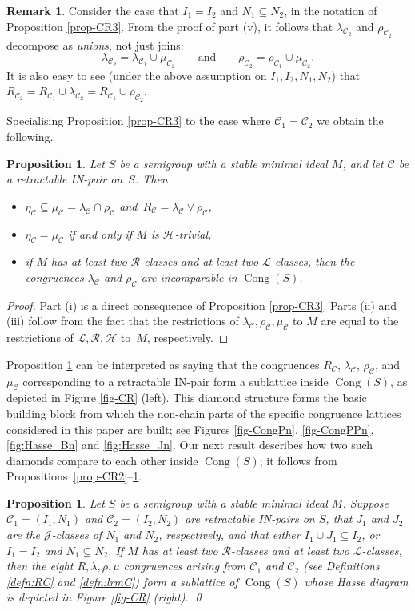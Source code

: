 \documentclass[11pt,a4paper]{article}
\newcommand{\C}{\mathscr C}
\renewcommand{\H}{\mathrel{\mathscr H}}
\renewcommand{\L}{\mathrel{\mathscr L}}
\newcommand{\R}{\mathrel{\mathscr R}}
\newcommand{\gJ}{\mathrel{\mathscr J}}
\newcommand{\lam}{\lambda}
\newcommand{\Cong}{\operatorname{Cong}}
\newcommand{\1}{\id_n}
\newcommand{\sub}{\subseteq}
\newcommand{\AND}{\qquad\text{and}\qquad}
\newcommand{\bit}{\begin{itemize}}
\newcommand{\eit}{\end{itemize}}
\newcommand{\itemit}[1]{\item[\emph{(#1)}]}
\newcommand{\pf}{\begin{proof}}
\newcommand{\epf}{\end{proof}}
\newcommand{\epfres}{\hfill\qed}
\numberwithin{equation}{section}
\newtheorem{prop}[equation]{Proposition}
\theoremstyle{definition}
\newtheorem{rem}[equation]{Remark}
\begin{document}
\begin{rem}\label{rem:nonprincipal}
Consider the case that $I_1=I_2$ and $N_1\sub N_2$, in the notation of Proposition \ref{prop-CR3}.  From the proof of part (v), it follows that $\lam_{\C_2}$ and $\rho_{\C_2}$ decompose as \emph{unions}, not just joins:
\[
\lam_{\C_2} = \lam_{\C_1}\cup\mu_{\C_2} \AND \rho_{\C_2} = \rho_{\C_1}\cup\mu_{\C_2}.
\]
It is also easy to see (under the above assumption on $I_1,I_2,N_1,N_2$) that $R_{\C_2}=R_{\C_1}\cup\lam_{\C_2}=R_{\C_1}\cup\rho_{\C_2}$.
\end{rem}

Specialising Proposition \ref{prop-CR3} to the case where $\C_1=\C_2$ we obtain
the following.

\begin{prop}
\label{prop-CR4}
Let $S$ be a semigroup with a stable minimal ideal $M$, and let $\C$ be a retractable IN-pair on~$S$.  Then 
\bit
\itemit{i} $\eta_\C\sub\mu_\C=\lambda_{\C}\cap \rho_{\C}$ and~$R_\C=\lambda_{\C}\vee \rho_{\C}$,
\itemit{ii} $\eta_\C=\mu_\C$ if and only if $M$ is $\H$-trivial,
\itemit{iii} if $M$ has at least two $\R$-classes and at least two $\L$-classes, then the congruences $\lambda_{\C}$ and $\rho_{\C}$ are incomparable in $\Cong(S)$.
\eit
\end{prop}

\pf Part (i) is a direct consequence of Proposition \ref{prop-CR3}.  Parts (ii) and (iii) follow from the fact that the restrictions of $\lambda_\C,\rho_\C,\mu_\C$ to $M$ are equal to the restrictions of $\L,\R,\H$ to~$M$, respectively. \epf

Proposition \ref{prop-CR4} can be interpreted as saying that the congruences
$R_{\C}$, $\lambda_{\C}$, $\rho_{\C}$, and $\mu_{\C}$ corresponding to a
retractable IN-pair form a sublattice inside $\Cong(S)$, as
depicted in Figure \ref{fig-CR} (left).
This diamond structure forms the basic building block from which the
non-chain parts of the specific congruence lattices considered in this paper are
built; see Figures \ref{fig-CongPn}, \ref{fig-CongPPn}, \ref{fig:Hasse_Bn} and
\ref{fig:Hasse_Jn}. Our next result describes how two such diamonds compare to
each other inside $\Cong(S)$; it follows from Propositions~\ref{prop-CR2}--\ref{prop-CR4}.


\begin{prop}
\label{prop-CR4a}
Let $S$ be a semigroup with a stable minimal ideal $M$.  Suppose $\C_1=(I_1,N_1)$ and $\C_2=(I_2, N_2)$ are retractable IN-pairs on $S$, that $J_1$ and $J_2$ are the $\gJ$-classes of $N_1$ and $N_2$, respectively, and that either $I_1\cup J_1\subseteq I_2$, or $I_1=I_2$ and $N_1\subseteq N_2$. If $M$ has at least two $\R$-classes and at least two $\L$-classes, then the eight $R,\lam,\rho,\mu$ congruences arising from $\C_1$ and $\C_2$ (see Definitions \ref{defn:RC} and \ref{defn:lrmC}) form a sublattice of $\Cong(S)$ whose Hasse diagram is depicted in Figure \ref{fig-CR} (right). \epfres
\end{prop}
\end{document}

